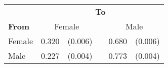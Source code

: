 
\begin{tabular}{lr@{ }r@{}cr@{ }r}
    \toprule
    & \multicolumn{5}{c}{\textbf{To}} \\
    \cmidrule(l){2-6}
    \textbf{From} & \multicolumn{2}{c}{Female} && \multicolumn{2}{c}{Male} \\
    \midrule
    Female & 0.320 & (0.006) &  & 0.680 & (0.006) \\
    Male & 0.227 & (0.004) &  & 0.773 & (0.004) \\
    \bottomrule
\end{tabular}

